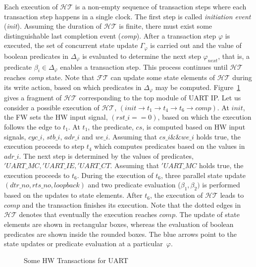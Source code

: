 \documentclass[sigconf]{acmart}
\begin{document}
Each execution of $\mathcal{HT}$ is a non-empty 
sequence of transaction steps where each transaction step 
happens in a single clock. The first step is called {\em initiation event}
(\textit{init}). Assuming the duration of $\mathcal{HT}$ is finite, 
there must exist some distinguishable last completion event (\textit{comp}). 
After a transaction step $\varphi$ is executed, the set of concurrent state
update $\Gamma_{\varphi}$ is carried out and the value of boolean predicates
in $\Delta_{\varphi}$ is evaluated to determine the next step
$\varphi_{next}$, that is, a predicate $\beta_i \in \Delta_{\varphi}$
enables a transaction step.  This process continues until $\mathcal{HT}$
reaches \textit{comp} state.  Note that $\mathcal{FT}$ can update some state
elements of $\mathcal{HT}$ during its write action, based on which
predicates in $\Delta_{\varphi}$ may be computed. 
Figure~\ref{fig:interleaving2} gives a fragment of $\mathcal{HT}$
corresponding to the top module of UART IP.  Let us consider a possible
execution of $\mathcal{HT}$, $(init \rightarrow t_1 \rightarrow t_4
\rightarrow t_6 \rightarrow comp)$.  At $init$, the FW sets the HW input
signal, $(rst\_i==0)$, based on which the execution follows the edge to
$t_1$.  At $t_1$, the predicate, $cs$, is computed based on HW input
signals, $cyc\_i$, $stb\_i$, $adr\_i$ and $we\_i$.  Assuming that $cs\_i
\&\& we\_i$ holds true, the execution proceeds to step $t_4$ which computes
predicates based on the values in $adr\_i$.  The next step is determined by
the values of predicates, $'UART\_MC, 'UART\_IE, 'UART\_CT$.  Assuming that
$'UART\_MC$ holds true, the execution proceeds to $t_6$.  During the
execution of $t_6$, three parallel state update $(dtr\_no, rts\_no,
loopback)$ and two predicate evaluation ($\beta_1,\beta_2)$ is performed
based on the updates to state elements.  After $t_6$, the execution of
$\mathcal{HT}$ leads to $comp$ and the transaction finishes its execution. 
Note that the dotted edges in $\mathcal{HT}$ denotes that eventually the
execution reaches $comp$.  The update of state elements are shown in
rectangular boxes, whereas the evaluation of boolean predicates are shown
inside the rounded boxes.  The blue arrows point to the state updates or
predicate evaluation at a particular~$\varphi$.

\begin{figure}[t]
\caption{Some HW Transactions for UART
\label{fig:interleaving2}}
\end{figure}
\end{document}
